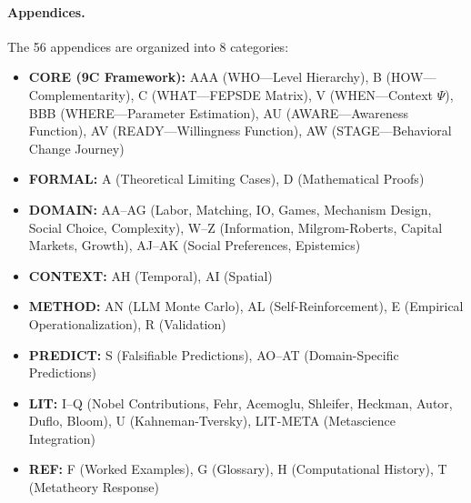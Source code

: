 \paragraph{Appendices.}
The 56 appendices are organized into 8 categories:

\begin{itemize}
    \item \textbf{CORE (9C Framework):} AAA (WHO---Level Hierarchy), B (HOW---Complementarity), C (WHAT---FEPSDE Matrix), V (WHEN---Context $\Psi$), BBB (WHERE---Parameter Estimation), AU (AWARE---Awareness Function), AV (READY---Willingness Function), AW (STAGE---Behavioral Change Journey)

    \item \textbf{FORMAL:} A (Theoretical Limiting Cases), D (Mathematical Proofs)

    \item \textbf{DOMAIN:} AA--AG (Labor, Matching, IO, Games, Mechanism Design, Social Choice, Complexity), W--Z (Information, Milgrom-Roberts, Capital Markets, Growth), AJ--AK (Social Preferences, Epistemics)

    \item \textbf{CONTEXT:} AH (Temporal), AI (Spatial)

    \item \textbf{METHOD:} AN (LLM Monte Carlo), AL (Self-Reinforcement), E (Empirical Operationalization), R (Validation)

    \item \textbf{PREDICT:} S (Falsifiable Predictions), AO--AT (Domain-Specific Predictions)

    \item \textbf{LIT:} I--Q (Nobel Contributions, Fehr, Acemoglu, Shleifer, Heckman, Autor, Duflo, Bloom), U (Kahneman-Tversky), LIT-META (Metascience Integration)

    \item \textbf{REF:} F (Worked Examples), G (Glossary), H (Computational History), T (Metatheory Response)
\end{itemize}

